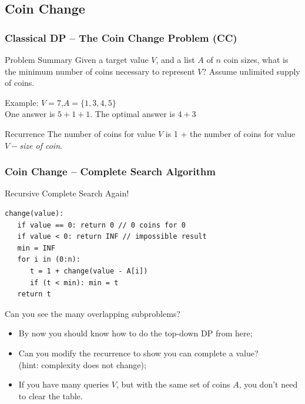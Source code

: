 \documentclass{beamer}
\begin{document}
\subsection{Coin Change}
\begin{frame}
  \frametitle{Classical DP -- The Coin Change Problem (CC)}
  \begin{block}{Problem Summary}
    Given a target value $V$, and a list $A$ of $n$ coin sizes, what
    is the minimum number of coins necessary to represent $V$? Assume
    unlimited supply of coins.
  \end{block}

  Example: $V = 7$,$A = \{1,3,4,5\}$\\
  \medskip
  One answer is $5+1+1$. The optimal answer is $4+3$

  \bigskip

  \begin{exampleblock}{Recurrence}
    The number of coins for value $V$ is 1 + the number of coins for
    value $V - $\emph{size of coin}.
  \end{exampleblock}
\end{frame}

\begin{frame}[fragile]
  \frametitle{Coin Change -- Complete Search Algorithm}
  {\smaller
  \begin{block}{Recursive Complete Search Again!}
\begin{verbatim}
change(value):
   if value == 0: return 0 // 0 coins for 0
   if value < 0: return INF // impossible result
   min = INF
   for i in (0:n):
      t = 1 + change(value - A[i])
      if (t < min): min = t
   return t
\end{verbatim}

\medskip

Can you see the many overlapping subproblems?
  \end{block}
\begin{itemize}
  \item By now you should know how to do the top-down DP from here;
  \item Can you modify the recurrence to show  you can complete a value?\\ 
    (hint: complexity does not change);
  \item If you have many queries $V$, but with the same set of coins
    $A$, you don't need to clear the table.
\end{itemize}


  }
\end{frame}
\end{document}
